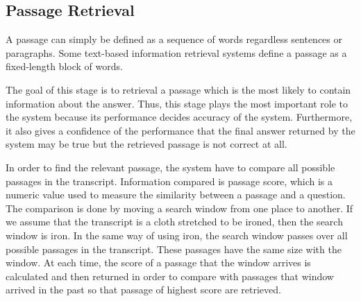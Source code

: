 \documentclass[10pt,a4paper]{article}
\numberwithin{algorithm}{section}  %
\begin{document}
\normalsize
\subsection{Passage Retrieval}

A passage can simply be defined as a sequence of words regardless sentences or paragraphs. Some text-based information retrieval systems define a passage as a fixed-length block of words. \cite{goharian2008dsp}

The goal of this stage is to retrieval a passage which is the most likely to contain information about the answer. Thus, this stage plays the most important role to the system because its performance decides accuracy of the system. Furthermore, it also gives a confidence of the performance that the final answer returned by the system may be true but the retrieved passage is not correct at all.

In order to find the relevant passage, the system have to compare all possible passages in the transcript. Information compared is passage score, which is a numeric value used to measure the similarity between a passage and a question.  The comparison is done by moving a search window from one place to another. If we assume that the transcript is a cloth stretched to be ironed, then the search window is iron. In the same way of using iron, the search window passes over all possible passages in the transcript. These passages have the same size with the window. At each time, the score of a passage that the window arrives is calculated and then returned in order to compare with passages that window arrived in the past so that passage of highest score are retrieved. 
\end{document}
